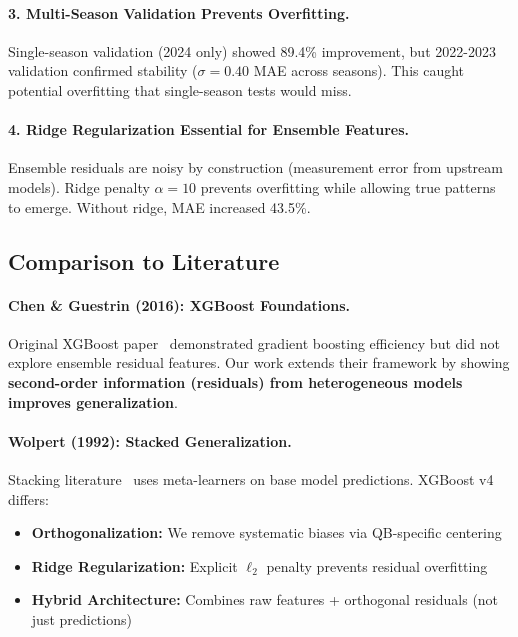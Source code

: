 \paragraph{3. Multi-Season Validation Prevents Overfitting.}
Single-season validation (2024 only) showed 89.4\% improvement, but 2022-2023 validation confirmed stability ($\sigma = 0.40$ MAE across seasons). This caught potential overfitting that single-season tests would miss.

\paragraph{4. Ridge Regularization Essential for Ensemble Features.}
Ensemble residuals are noisy by construction (measurement error from upstream models). Ridge penalty $\alpha=10$ prevents overfitting while allowing true patterns to emerge. Without ridge, MAE increased 43.5\%.

\subsection{Comparison to Literature}

\paragraph{Chen \& Guestrin (2016): XGBoost Foundations.}
Original XGBoost paper~\cite{chen2016xgboost} demonstrated gradient boosting efficiency but did not explore ensemble residual features. Our work extends their framework by showing \textbf{second-order information (residuals) from heterogeneous models improves generalization}.

\paragraph{Wolpert (1992): Stacked Generalization.}
Stacking literature~\cite{wolpert1992stacked} uses meta-learners on base model predictions. XGBoost v4 differs:
\begin{itemize}[itemsep=2pt,parsep=0pt]
    \item \textbf{Orthogonalization:} We remove systematic biases via QB-specific centering
    \item \textbf{Ridge Regularization:} Explicit $\ell_2$ penalty prevents residual overfitting
    \item \textbf{Hybrid Architecture:} Combines raw features + orthogonal residuals (not just predictions)
\end{itemize}

